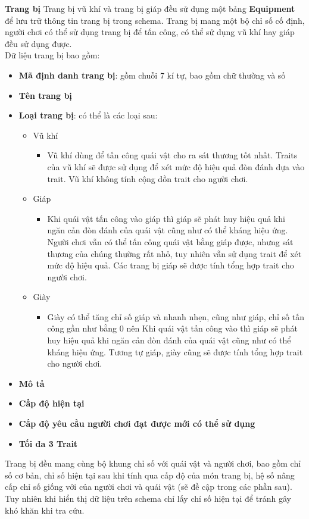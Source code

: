 \textbf{Trang bị}
\hspace*{0.5cm} Trang bị vũ khí và trang bị giáp đều sử dụng một bảng \textbf{Equipment} để lưu trữ thông tin trang bị trong schema. Trang bị mang một bộ chỉ số cố định, người chơi có thể sử dụng trang bị để tấn công, có thể sử dụng vũ khí hay giáp đều sử dụng được.\\

\hspace*{0.5cm} Dữ liệu trang bị bao gồm:\\
\begin{itemize}
	\item \textbf{Mã định danh trang bị}: gồm chuỗi 7 kí tự, bao gồm chữ thường và số
	\item \textbf{Tên trang bị}
	\item \textbf{Loại trang bị}: có thể là các loại sau:
	\begin{itemize}
		\item Vũ khí
		\begin{itemize}
			\item Vũ khí dùng để tấn công quái vật cho ra sát thương tốt nhất. Traits của vũ khí sẽ được sử dụng để xét mức độ hiệu quả đòn đánh dựa vào trait. Vũ khí không tính cộng dồn trait cho người chơi.
		\end{itemize}
		\item Giáp
		\begin{itemize}
			\item Khi quái vật tấn công vào giáp thì giáp sẽ phát huy hiệu quả khi ngăn cản đòn đánh của quái vật cũng như có thể kháng hiệu ứng. Người chơi vẫn có thể tấn công quái vật bằng giáp được, nhưng sát thương của chúng thường rất nhỏ, tuy nhiên vẫn sử dụng trait để xét mức độ hiệu quả. Các trang bị giáp sẽ được tính tổng hợp trait cho người chơi.
		\end{itemize}
		\item Giày
		\begin{itemize}
			\item Giày có thể tăng chỉ số giáp và nhanh nhẹn, cũng như giáp, chỉ số tấn công gần như bằng 0 nên Khi quái vật tấn công vào thì giáp sẽ phát huy hiệu quả khi ngăn cản đòn đánh của quái vật cũng như có thể kháng hiệu ứng. Tương tự giáp, giày cũng sẽ được tính tổng hợp trait cho người chơi.
		\end{itemize}
	\end{itemize}
	\item \textbf{Mô tả}
	\item \textbf{Cấp độ hiện tại}
	\item \textbf{Cấp độ yêu cầu người chơi đạt được mới có thể sử dụng}
	\item \textbf{Tối đa 3 Trait}
\end{itemize}
\hspace*{0.5cm} Trang bị đều mang cùng bộ khung chỉ số với quái vật và người chơi, bao gồm chỉ số cơ bản, chỉ số hiện tại sau khi tính qua cấp độ của món trang bị, hệ số nâng cấp chỉ số giống với của người chơi và quái vật (sẽ đề cập trong các phần sau). Tuy nhiên khi hiển thị dữ liệu trên schema chỉ lấy chỉ số hiện tại để tránh gây khó khăn khi tra cứu.\\


